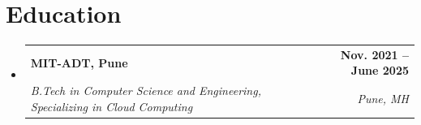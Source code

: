 \documentclass[letterpaper,11pt]{article}
\makeatletter
\newcommand{\resumeSubheading}[4]{
  \vspace{-2pt}\item
    \begin{tabular*}{1.0\textwidth}[t]{l@{\extracolsep{\fill}}r}
      \textbf{#1} & \textbf{\small #2} \\
      \textit{\small#3} & \textit{\small #4} \\
    \end{tabular*}\vspace{-7pt}
}
\newcommand{\resumeSubHeadingListStart}{\begin{itemize}[leftmargin=0.0in, label={}]}
\newcommand{\resumeSubHeadingListEnd}{\end{itemize}}
\makeatother
\begin{document}
\vspace{-0.5em}



\section{Education}
  \resumeSubHeadingListStart
    \resumeSubheading
      {MIT-ADT, Pune}{Nov. 2021 -- June 2025}
      {B.Tech in Computer Science and Engineering, Specializing in Cloud Computing}{Pune, MH}
  \resumeSubHeadingListEnd

\end{document}
